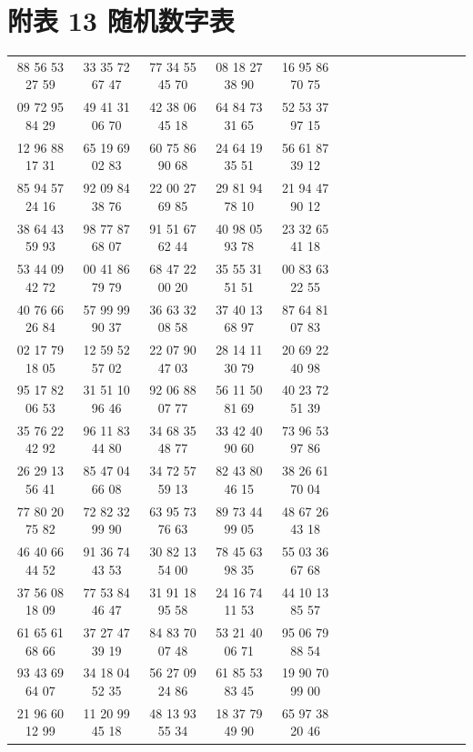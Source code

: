\documentclass[lang=cn,10pt]{elegantbook}
\begin{document}
\newpage

\section{附表 13 随机数字表}
\scriptsize
\begin{longtable}{ccccccccccccccc}
    88 56 53 27 59 & 33 35 72 67 47 & 77 34 55 45 70 & 08 18 27 38 90 & 16 95 86 70 75 \\
    09 72 95 84 29 & 49 41 31 06 70 & 42 38 06 45 18 & 64 84 73 31 65 & 52 53 37 97 15 \\
    12 96 88 17 31 & 65 19 69 02 83 & 60 75 86 90 68 & 24 64 19 35 51 & 56 61 87 39 12 \\
    85 94 57 24 16 & 92 09 84 38 76 & 22 00 27 69 85 & 29 81 94 78 10 & 21 94 47 90 12 \\
    38 64 43 59 93 & 98 77 87 68 07 & 91 51 67 62 44 & 40 98 05 93 78 & 23 32 65 41 18 \\
    53 44 09 42 72 & 00 41 86 79 79 & 68 47 22 00 20 & 35 55 31 51 51 & 00 83 63 22 55 \\
    40 76 66 26 84 & 57 99 99 90 37 & 36 63 32 08 58 & 37 40 13 68 97 & 87 64 81 07 83 \\
    02 17 79 18 05 & 12 59 52 57 02 & 22 07 90 47 03 & 28 14 11 30 79 & 20 69 22 40 98 \\
    95 17 82 06 53 & 31 51 10 96 46 & 92 06 88 07 77 & 56 11 50 81 69 & 40 23 72 51 39 \\
    35 76 22 42 92 & 96 11 83 44 80 & 34 68 35 48 77 & 33 42 40 90 60 & 73 96 53 97 86 \\
    26 29 13 56 41 & 85 47 04 66 08 & 34 72 57 59 13 & 82 43 80 46 15 & 38 26 61 70 04 \\
    77 80 20 75 82 & 72 82 32 99 90 & 63 95 73 76 63 & 89 73 44 99 05 & 48 67 26 43 18 \\
    46 40 66 44 52 & 91 36 74 43 53 & 30 82 13 54 00 & 78 45 63 98 35 & 55 03 36 67 68 \\
    37 56 08 18 09 & 77 53 84 46 47 & 31 91 18 95 58 & 24 16 74 11 53 & 44 10 13 85 57 \\
    61 65 61 68 66 & 37 27 47 39 19 & 84 83 70 07 48 & 53 21 40 06 71 & 95 06 79 88 54 \\
    93 43 69 64 07 & 34 18 04 52 35 & 56 27 09 24 86 & 61 85 53 83 45 & 19 90 70 99 00 \\
    21 96 60 12 99 & 11 20 99 45 18 & 48 13 93 55 34 & 18 37 79 49 90 & 65 97 38 20 46 \\

\end{longtable}
\end{document}
